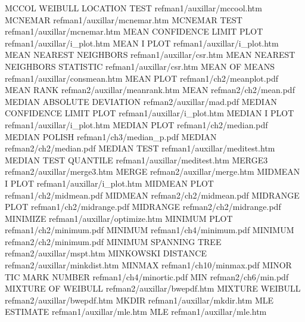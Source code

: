 MCCOL WEIBULL LOCATION TEST             refman1/auxillar/mccool.htm
MCNEMAR                                 refman1/auxillar/mcnemar.htm
MCNEMAR TEST                            refman1/auxillar/mcnemar.htm
MEAN CONFIDENCE LIMIT PLOT              refman1/auxillar/i_plot.htm
MEAN I PLOT                             refman1/auxillar/i_plot.htm
MEAN NEAREST NEIGHBORS                  refman1/auxillar/csr.htm
MEAN NEAREST NEIGHBORS STATISTIC        refman1/auxillar/csr.htm
MEAN OF MEANS                           refman1/auxillar/consmean.htm
MEAN PLOT                               refman1/ch2/meanplot.pdf
MEAN RANK                               refman2/auxillar/meanrank.htm
MEAN                                    refman2/ch2/mean.pdf
MEDIAN ABSOLUTE DEVIATION               refman2/auxillar/mad.pdf
MEDIAN CONFIDENCE LIMIT PLOT            refman1/auxillar/i_plot.htm
MEDIAN I PLOT                           refman1/auxillar/i_plot.htm
MEDIAN PLOT                             refman1/ch2/median.pdf
MEDIAN POLISH                           refman1/ch3/median_p.pdf
MEDIAN                                  refman2/ch2/median.pdf
MEDIAN TEST                             refman1/auxillar/meditest.htm
MEDIAN TEST QUANTILE                    refman1/auxillar/meditest.htm
MERGE3                                  refman2/auxillar/merge3.htm
MERGE                                   refman2/auxillar/merge.htm
MIDMEAN I PLOT                          refman1/auxillar/i_plot.htm
MIDMEAN PLOT                            refman1/ch2/midmean.pdf
MIDMEAN                                 refman2/ch2/midmean.pdf
MIDRANGE PLOT                           refman1/ch2/midrange.pdf
MIDRANGE                                refman2/ch2/midrange.pdf
MINIMIZE                                refman1/auxillar/optimize.htm
MINIMUM PLOT                            refman1/ch2/minimum.pdf
MINIMUM                                 refman1/ch4/minimum.pdf
MINIMUM                                 refman2/ch2/minimum.pdf
MINIMUM SPANNING TREE                   refman2/auxillar/mspt.htm
MINKOWSKI DISTANCE                      refman2/auxillar/minkdist.htm
MINMAX                                  refman1/ch10/minmax.pdf
MINOR TIC MARK NUMBER                   refman1/ch4/minortic.pdf
MIN                                     refman2/ch6/min.pdf
MIXTURE OF WEIBULL                      refman2/auxillar/bwepdf.htm
MIXTURE WEIBULL                         refman2/auxillar/bwepdf.htm
MKDIR                                   refman1/auxillar/mkdir.htm
MLE ESTIMATE                            refman1/auxillar/mle.htm
MLE                                     refman1/auxillar/mle.htm
